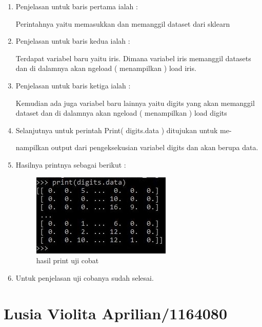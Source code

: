 \begin{enumerate}
\begin{itemize}
\begin{enumerate}
\item Penjelasan untuk baris pertama ialah : 
\par Perintahnya yaitu memasukkan dan memanggil dataset dari sklearn
\par
\par
\item Penjelasan untuk baris kedua ialah :
\par Terdapat variabel baru yaitu iris. Dimana variabel iris memanggil datasets dan di dalamnya akan ngeload ( menampilkan ) load iris.
\par
\item Penjelasan untuk baris ketiga ialah :
\par Kemudian ada juga variabel baru lainnya yaitu digits yang akan memanggil dataset dan di dalamnya akan ngeload ( menampilkan ) load digits
\par
\item Selanjutnya untuk perintah Print( digits.data ) ditujukan untuk me-
\par nampilkan output dari pengeksekusian variabel digits dan akan berupa data.
\par
\item Hasilnya printnya sebagai berikut :
\par

\begin{figure}[ht]
\centering
\includegraphics[scale=0.7]{figures/okk4.jpg}
\caption{hasil print uji cobat}
\label{contoh}
\end{figure}

\par
\item Untuk penjelasan uji cobanya sudah selesai.
\par
\end{enumerate}
\end{itemize}
\end{enumerate}

\section{Lusia Violita Aprilian/1164080}
